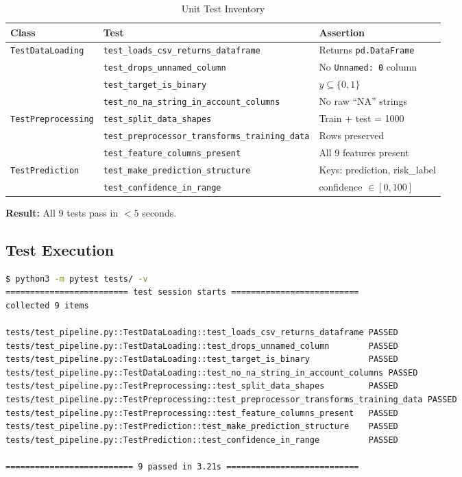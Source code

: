 \documentclass[12pt,a4paper]{article}
\theoremstyle{definition}
\newcommand{\code}[1]{\texttt{#1}}
\begin{document}
\begin{table}[H]
  \centering
  \caption{Unit Test Inventory}
  \label{tab:tests}
  \begin{tabularx}{\linewidth}{llX}
    \toprule
    \textbf{Class} & \textbf{Test} & \textbf{Assertion} \\
    \midrule
    \multirow{4}{*}{\code{TestDataLoading}}
      & \code{test\_loads\_csv\_returns\_dataframe}    & Returns \code{pd.DataFrame} \\
      & \code{test\_drops\_unnamed\_column}             & No \code{Unnamed: 0} column \\
      & \code{test\_target\_is\_binary}                 & $y \subseteq \{0,1\}$ \\
      & \code{test\_no\_na\_string\_in\_account\_columns} & No raw ``NA'' strings \\
    \midrule
    \multirow{3}{*}{\code{TestPreprocessing}}
      & \code{test\_split\_data\_shapes}                & Train + test = 1000 \\
      & \code{test\_preprocessor\_transforms\_training\_data} & Rows preserved \\
      & \code{test\_feature\_columns\_present}          & All 9 features present \\
    \midrule
    \multirow{2}{*}{\code{TestPrediction}}
      & \code{test\_make\_prediction\_structure}        & Keys: prediction, risk\_label \\
      & \code{test\_confidence\_in\_range}              & confidence $\in [0,100]$ \\
    \bottomrule
  \end{tabularx}
\end{table}

\textbf{Result:} All 9 tests pass in $< 5$ seconds.

\subsection{Test Execution}

\begin{lstlisting}[language=bash, caption={Running the full test suite}]
$ python3 -m pytest tests/ -v
========================= test session starts ==========================
collected 9 items

tests/test_pipeline.py::TestDataLoading::test_loads_csv_returns_dataframe PASSED
tests/test_pipeline.py::TestDataLoading::test_drops_unnamed_column        PASSED
tests/test_pipeline.py::TestDataLoading::test_target_is_binary            PASSED
tests/test_pipeline.py::TestDataLoading::test_no_na_string_in_account_columns PASSED
tests/test_pipeline.py::TestPreprocessing::test_split_data_shapes         PASSED
tests/test_pipeline.py::TestPreprocessing::test_preprocessor_transforms_training_data PASSED
tests/test_pipeline.py::TestPreprocessing::test_feature_columns_present   PASSED
tests/test_pipeline.py::TestPrediction::test_make_prediction_structure    PASSED
tests/test_pipeline.py::TestPrediction::test_confidence_in_range          PASSED

========================== 9 passed in 3.21s ===========================
\end{lstlisting}
\end{document}
